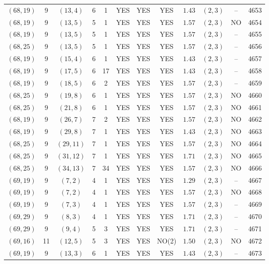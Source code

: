\begin{longtable}{|c|c|c|c|c|c|c|c|c|c|c|c|}
$(68,19)$ & 9 & $(13,4)$ & 6 & 1 & YES & YES & YES & $1.43$ & $(2,3)$ & -- & 4653\\
$(68,19)$ & 9 & $(13,5)$ & 5 & 1 & YES & YES & YES & $1.57$ & $(2,3)$ & NO & 4654\\
$(68,19)$ & 9 & $(13,5)$ & 5 & 1 & YES & YES & YES & $1.57$ & $(2,3)$ & -- & 4655\\
$(68,25)$ & 9 & $(13,5)$ & 5 & 1 & YES & YES & YES & $1.57$ & $(2,3)$ & -- & 4656\\
$(68,19)$ & 9 & $(15,4)$ & 6 & 1 & YES & YES & YES & $1.43$ & $(2,3)$ & -- & 4657\\
$(68,19)$ & 9 & $(17,5)$ & 6 & 17 & YES & YES & YES & $1.43$ & $(2,3)$ & -- & 4658\\
$(68,19)$ & 9 & $(18,5)$ & 6 & 2 & YES & YES & YES & $1.57$ & $(2,3)$ & -- & 4659\\
$(68,25)$ & 9 & $(19,8)$ & 6 & 1 & YES & YES & YES & $1.57$ & $(2,3)$ & NO & 4660\\
$(68,25)$ & 9 & $(21,8)$ & 6 & 1 & YES & YES & YES & $1.57$ & $(2,3)$ & NO & 4661\\
$(68,19)$ & 9 & $(26,7)$ & 7 & 2 & YES & YES & YES & $1.57$ & $(2,3)$ & NO & 4662\\
$(68,19)$ & 9 & $(29,8)$ & 7 & 1 & YES & YES & YES & $1.43$ & $(2,3)$ & NO & 4663\\
$(68,25)$ & 9 & $(29,11)$ & 7 & 1 & YES & YES & YES & $1.57$ & $(2,3)$ & NO & 4664\\
$(68,25)$ & 9 & $(31,12)$ & 7 & 1 & YES & YES & YES & $1.71$ & $(2,3)$ & NO & 4665\\
$(68,25)$ & 9 & $(34,13)$ & 7 & 34 & YES & YES & YES & $1.57$ & $(2,3)$ & NO & 4666\\
$(69,19)$ & 9 & $(7,2)$ & 4 & 1 & YES & YES & YES & $1.29$ & $(2,3)$ & -- & 4667\\
$(69,19)$ & 9 & $(7,2)$ & 4 & 1 & YES & YES & YES & $1.57$ & $(2,3)$ & NO & 4668\\
$(69,19)$ & 9 & $(7,3)$ & 4 & 1 & YES & YES & YES & $1.57$ & $(2,3)$ & -- & 4669\\
$(69,29)$ & 9 & $(8,3)$ & 4 & 1 & YES & YES & YES & $1.71$ & $(2,3)$ & -- & 4670\\
$(69,29)$ & 9 & $(9,4)$ & 5 & 3 & YES & YES & YES & $1.71$ & $(2,3)$ & -- & 4671\\
$(69,16)$ & 11 & $(12,5)$ & 5 & 3 & YES & YES & NO(2) & $1.50$ & $(2,3)$ & NO & 4672\\
$(69,19)$ & 9 & $(13,3)$ & 6 & 1 & YES & YES & YES & $1.43$ & $(2,3)$ & -- & 4673\\

\end{longtable}

